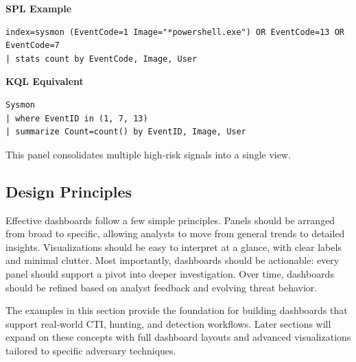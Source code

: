 \textbf{SPL Example}
\begin{lstlisting}
index=sysmon (EventCode=1 Image="*powershell.exe") OR EventCode=13 OR EventCode=7
| stats count by EventCode, Image, User
\end{lstlisting}

\textbf{KQL Equivalent}
\begin{lstlisting}
Sysmon
| where EventID in (1, 7, 13)
| summarize Count=count() by EventID, Image, User
\end{lstlisting}

This panel consolidates multiple high‑risk signals into a single view.

\subsection*{Design Principles}

Effective dashboards follow a few simple principles. Panels should be arranged from broad to specific, allowing analysts to move from general trends to detailed insights. Visualizations should be easy to interpret at a glance, with clear labels and minimal clutter. Most importantly, dashboards should be actionable: every panel should support a pivot into deeper investigation. Over time, dashboards should be refined based on analyst feedback and evolving threat behavior.

The examples in this section provide the foundation for building dashboards that support real‑world CTI, hunting, and detection workflows. Later sections will expand on these concepts with full dashboard layouts and advanced visualizations tailored to specific adversary techniques.

